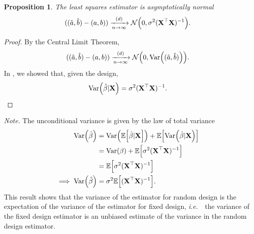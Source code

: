 \documentclass[letterpaper, reqno]{amsart}
\newtheorem{prop}{Proposition}[section]
\numberwithin{equation}{section}
\newcommand{\T}{\top} %
\newcommand{\vect}[1]{\boldsymbol{\mathbf{#1}}} %
\newcommand{\ie}{\emph{i.e.\ }}
\newcommand{\E}[1]{\mathbb{E}\mleft[#1\mright]}
\newcommand{\Var}[1]{\operatorname{Var}\mleft(#1\mright)}
\newcommand{\N}[2]{\mathcal{N}\mleft( #1, #2 \mright)}
\newcommand{\Dlim}{\xrightarrow[n \to \infty]{(d)}}
\newcommand{\Xm}{\vect{X}}
\newcommand{\Bv}{\beta}
\newcommand{\Bvh}{\hat{\beta}}
\begin{document}
\begin{prop}
  The least squares estimator is asymptotically normal
  \[ ((\hat{a}, \hat{b}) - (a, b)) \Dlim \N{0}{\sigma^2 (\Xm^\T\Xm)^{-1}}. \]
\end{prop}

\begin{proof}
  By the Central Limit Theorem,
  \[ ((\hat{a}, \hat{b}) - (a, b)) \Dlim \N{0}{\Var{(\hat{a}, \hat{b})}}. \]
  In , we showed that, given the design,
  \[ \Var{\Bvh|\Xm} = \sigma^2 (\Xm^\T\Xm)^{-1}. \qedhere \]
\end{proof}

\begin{tcolorbox}
  \emph{Note.}
  The unconditional variance is given by the law of total variance
  \begin{align*}
    \Var{\Bvh} &= \Var{\E{\Bvh|\Xm}} + \E{\Var{\Bvh|\Xm}} \\
              &= \Var{\Bv} + \E{\sigma^2 (\Xm^\T\Xm)^{-1}} \\
              &= \E{\sigma^2 (\Xm^\T\Xm)^{-1}} \\
    \implies \Var{\Bvh} &= \sigma^2 \E{(\Xm^\T\Xm)^{-1}}.
  \end{align*}
  This result shows that the variance of the estimator for random design is the
  expectation of the variance of the estimator for fixed design, \ie\ the
  variance of the fixed design estimator is an unbiased estimate of the variance
  in the random design estimator.
\end{tcolorbox}
\end{document}

